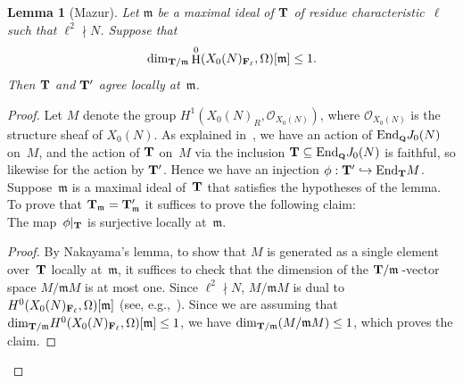 \documentclass[10pt,twoside]{article}
\newcommand{\Q}{{\bf{Q}}}
\newcommand{\F}{{\bf{F}}}
\newcommand{\T}{{\bf{T}}}
\newcommand{\m}{{\mathfrak{m}}}
\newcommand{\tensor}{\otimes}
\newcommand{\ra}{\rightarrow}
\newcommand{\OO}{{\mathcal{O}}}
\newcommand{\EJ}{{{\rm End}_{\scriptscriptstyle \Q} J_0(N)}}
\newcommand{\Tm}{{\T_{(\m)}}}
\newcommand{\Mm}{{M_{(\m)}}}
\newcommand{\Tpm}{{\T'_{(\m)}}}
\newcommand{\Fell}{\mathbf{F}_\ell}
\renewcommand{\H}{\HHH}
\newcommand{\comment}[1]{}
\newtheorem{lem}{Lemma}[section]
\theoremstyle{definition}
\DeclareMathOperator{\HHH}{H}
\begin{document}
\begin{lem}[Mazur]\label{lem:m1}
Let $\m$ be a maximal ideal of $\T$ of residue characteristic~$\ell$
such that $\ell^2 \nmid N$. 
Suppose that 
$$
 \dim_{\T/\m} \H^0(X_0(N)_{\Fell},\Omega)[\m] \leq 1.
$$
Then $\T$ and $\T'$ agree locally at~$\m$.
\end{lem}

\begin{proof}
Let $M$ denote the group
$H^1(X_0(N)_R, \OO_{X_0(N)})$,
where $\OO_{X_0(N)}$ is the structure sheaf of $X_0(N)$.
As explained in~\cite[p.~95]{mazur:eisenstein}, 
we have an action of $\EJ$ on~$M$, and 
the action of $\T$ on~$M$ via the inclusion $\T  \subseteq \EJ$
is faithful, so likewise for the action by $\T'$. Hence we have an injection
$\phi: \T' \hookrightarrow {\rm End}_{\T} M$.
Suppose~$\m$ is a maximal ideal of~$\T$ that satisfies the hypotheses
of the lemma. 
To prove that $\T_\m=\T_\m'$ it suffices to
prove the following claim:\\

 The map~$\phi|_{\T}$ is surjective locally at~$\m$.
\begin{proof}
By Nakayama's lemma, to show that $M$ is generated
as a single element over~$\T$ locally at~$\m$,
it suffices to check that the dimension of the ${\T/\m}\,$-vector space
$M / \m M$ is at most one.
Since \mbox{$\ell^2 \nmid N$}, 
$M/ \m M$ is dual to  
$H^0(X_0(N)_{\F_\ell}, \Omega) [\m]$ (see, e.g.,~\cite[\S2]{mazur:rational}).
Since we are assuming that 
${\rm dim}_{\T/\m} H^0(X_0(N)_{\F_\ell}, \Omega) [\m] \leq 1$, we have
${\rm dim}_{\T/\m} (M/ \m M) \leq 1$, which proves the claim.
\end{proof}


\comment{
Thus $M \tensor \T_\m$ is free of rank one over~$\T_\m$. The
composite $\EJ \tensor \T_\m
\ra {\rm End}_{\T_\m} (M \tensor \T_\m)
\stackrel{{\phi}^{-1}}{\ra} \T_\m$ gives a section of the inclusion
$\T_\m \hookrightarrow \EJ \tensor \T_\m$. This shows
that $\T_\m$ is saturated in $\EJ \tensor \T_\m$, i.e.,
that $\T$ and $\T'$ agree locally at~$\m$.
}
\end{proof}
\end{document}
